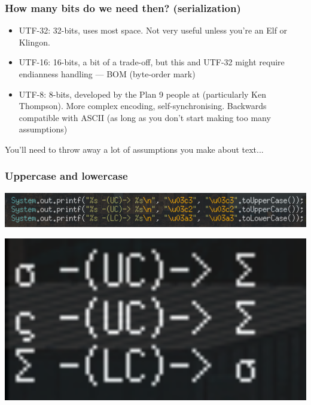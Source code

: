 \documentclass[%
        hyperref={%
                pdfauthor={Zakariyya Mughal},%
                pdfpagemode={None},pdfpagelayout={SinglePage}}%
        xcolor={x11names},%
]{beamer}
\begin{document}
\begin{frame}
\frametitle{How many bits do we need then? (serialization)}
\begin{itemize}
	\item UTF-32: 32-bits, uses most space. Not very useful unless you're an Elf or Klingon.
	\item UTF-16: 16-bits, a bit of a trade-off, but this and
	UTF-32 might require endianness handling --- BOM (byte-order mark)
	\item UTF-8: 8-bits, developed by the Plan 9 people at
	(particularly Ken Thompson). More complex encoding,
	self-synchronising. Backwards compatible with ASCII \pause (as
	long as you don't start making too many assumptions)
\end{itemize}
\end{frame}

\begin{frame}
\begin{center}
You'll need to throw away a lot of assumptions you make about text...
\end{center}
\end{frame}

\begin{frame}
\frametitle{Uppercase and lowercase}
\begin{center}
\begin{minipage}{0.9\textwidth}
\includegraphics[width=1\textwidth]{gfx/java-uc-lc.png}
\end{minipage}
\end{center}

\bigskip

\begin{center}
\begin{minipage}{0.3\textwidth}
\includegraphics[width=1\textwidth]{gfx/java-uc-lc-out.png}
\end{minipage}
\end{center}
\end{frame}
\end{document}
